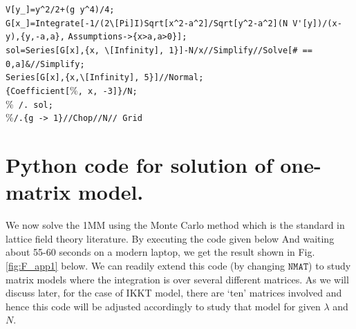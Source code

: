 \documentclass[11pt]{article}
\begin{document}
\begin{mdframed}[backgroundcolor=magenta!1] 
	\begin{footnotesize} 
		\noindent 
		\verb"V[y_]=y^2/2+(g y^4)/4;"\\
		\verb"G[x_]=Integrate[-1/(2\[Pi]I)Sqrt[x^2-a^2]/Sqrt[y^2-a^2](N V'[y])/(x-y),{y,-a,a}," \newline
		\verb"Assumptions->{x>a,a>0}];"\\
		\verb"sol=Series[G[x],{x, \[Infinity], 1}]-N/x//Simplify//Solve[# == 0,a]&//Simplify; "\\
		\verb"Series[G[x],{x,\[Infinity], 5}]//Normal; "\\
		\verb"{Coefficient["\%\verb", x, -3]}/N;"\\
		\%\verb" /. sol;"\\
		\%\verb"/.{g -> 1}//Chop//N// Grid"\\
	\end{footnotesize} 
\end{mdframed}


\section{Python code for solution of one-matrix model.}
We now solve the 1MM using the Monte Carlo method which is the 
standard in lattice field theory literature. By executing the code given below
And waiting about 55-60 seconds on a modern laptop, we get the result shown in 
Fig. \ref{fig:F_app1} below. We can readily extend this code (by changing $\texttt{NMAT}$) to study matrix models where the integration is over several different matrices. As we will discuss later, for the case of IKKT model, there are `ten' matrices involved and hence this code will be adjusted accordingly to study that model for given $\lambda$ and $N$. 

\begin{footnotesize} 
\begin{mdframed}[backgroundcolor=magenta!2] 

\end{mdframed} 
	\end{footnotesize} 
	
\end{document}
